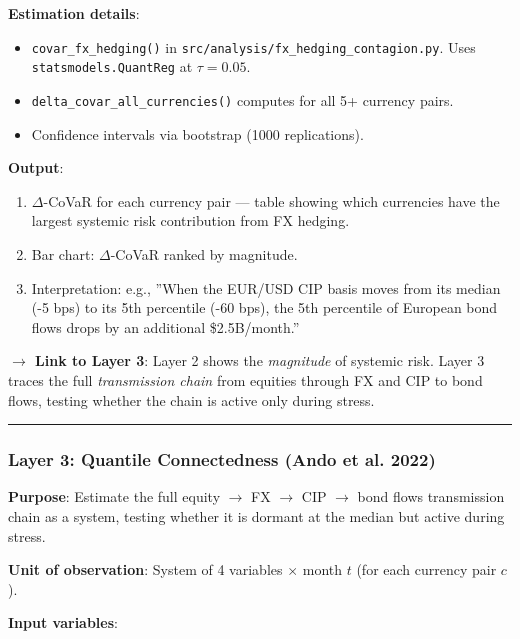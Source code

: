 \documentclass[11pt,a4paper]{article}
\begin{document}
\textbf{Estimation details}:
\begin{itemize}
\item \texttt{covar\_fx\_hedging()} in \texttt{src/analysis/fx\_hedging\_contagion.py}. Uses \texttt{statsmodels.QuantReg} at $\tau = 0.05$.
\item \texttt{delta\_covar\_all\_currencies()} computes for all 5+ currency pairs.
\item Confidence intervals via bootstrap (1000 replications).

\end{itemize}
\textbf{Output}:
\begin{enumerate}
\item $\Delta$-CoVaR for each currency pair --- table showing which currencies have the largest systemic risk contribution from FX hedging.
\item Bar chart: $\Delta$-CoVaR ranked by magnitude.
\item Interpretation: e.g., ''When the EUR/USD CIP basis moves from its median (-5 bps) to its 5th percentile (-60 bps), the 5th percentile of European bond flows drops by an additional \$2.5B/month.''

\end{enumerate}
\textbf{$\rightarrow$ Link to Layer 3}: Layer 2 shows the \textit{magnitude} of systemic risk. Layer 3 traces the full \textit{transmission chain} from equities through FX and CIP to bond flows, testing whether the chain is active only during stress.


\bigskip\noindent\rule{\textwidth}{0.4pt}\bigskip


\subsubsection{Layer 3: Quantile Connectedness (Ando et al. 2022)}

\textbf{Purpose}: Estimate the full equity $\rightarrow$ FX $\rightarrow$ CIP $\rightarrow$ bond flows transmission chain as a system, testing whether it is dormant at the median but active during stress.

\textbf{Unit of observation}: System of 4 variables $\times$ month $t$ (for each currency pair $c$).

\textbf{Input variables}:
\end{document}
